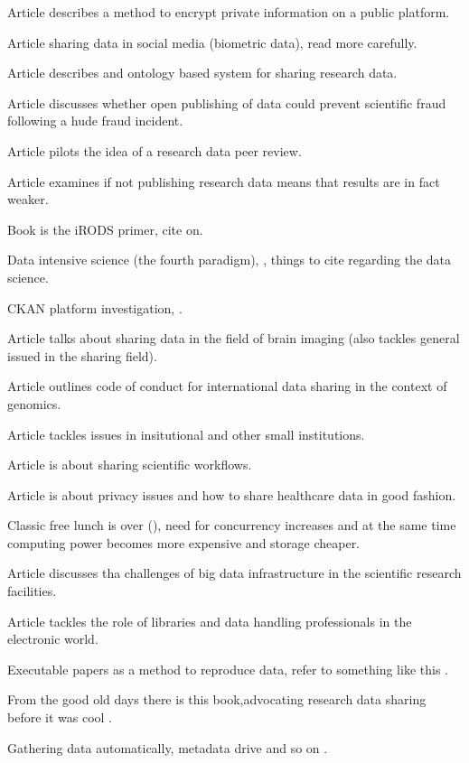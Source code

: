 Article \cite{DBLP:journals/jam/NohCJ14a} describes a method to encrypt private
information on a public platform.

Article \cite{DBLP:conf/ACMdis/CurmiFW14a} sharing data in social media
(biometric data), read more carefully.

Article \cite{DBLP:conf/esws/EkaputraSSB14} describes and ontology based
system for sharing research data.

Article \cite{DBLP:journals/ijdc/DoornDH13} discusses whether open publishing
of data could prevent scientific fraud following a hude fraud incident.

Article \cite{DBLP:journals/ijdc/GrootveldE12} pilots the idea of a research
data peer review.

Article \cite{wicherts2011willingness} examines if not publishing research data
means that results are in fact weaker.

Book \cite{DBLP:series/synthesis/2010Rajasekar} is the iRODS primer, cite
on.

Data intensive science (the fourth paradigm), \cite{DBLP:books/ms/4paradigm09},
things to cite regarding the data science.

CKAN platform investigation, \cite{winn2013open}.

Article \cite{DBLP:journals/fini/PolineBGGHHHHKMPSAK12} talks about sharing
data in the field of brain imaging (also tackles general issued in the sharing
field).

Article \cite{knoppers2011towards} outlines code of conduct for international
data sharing in the context of genomics.

Article \cite{cragin2010data} tackles issues in insitutional and other small
institutions.

Article \cite{DBLP:journals/fgcs/RoureGS09} is about sharing scientific
workflows.

Article \cite{kaye2012tension} is about privacy issues and how to share
healthcare data in good fashion.

Classic free lunch is over (\cite{sutter2005free}), need for concurrency
increases and at the same time computing power becomes more expensive and
storage cheaper.

Article \cite{DBLP:conf/cloudcom/DemchenkoZGWL12} discusses tha challenges
of big data infrastructure in the scientific research facilities.

Article \cite{hjorland2014curating} tackles the role of libraries and data
handling professionals in the electronic world.

Executable papers as a method to reproduce data, refer to something like
this \cite{DBLP:journals/procedia/GorpM11}.

From the good old days there is this book,advocating research data sharing
before it was cool \cite{fienberg1985sharing}.

Gathering data automatically, metadata drive and so on
\cite{DBLP:journals/jbi/HarrisTTPGC09}.
